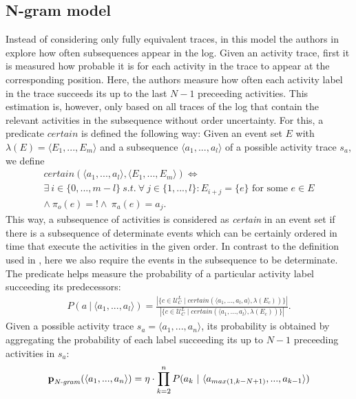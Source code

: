 \subsection{N-gram model}
Instead of considering only fully equivalent traces, in this model the authors in \cite{por} explore how often subsequences appear in the log.
Given an activity trace, first it is measured how probable it is for each activity in the trace to appear at the corresponding position.
Here, the authors measure how often each activity label in the trace succeeds its up to the last $N-1$ preceeding activities.
This estimation is, however, only based on all traces of the log that contain the relevant activities in the subsequence without order uncertainty.
For this, a predicate $certain$ is defined the following way: 
Given an event set $E$ with $\lambda(E)=\langle E_1,...,E_m\rangle$ and a subsequence $\langle a_1,...,a_l\rangle$ of a possible activity trace $s_a$, we define
\begin{align*}
certain(\langle a_1,...,a_l \rangle, \langle E_1,...,E_m \rangle) \Leftrightarrow \\
\exists ~ i \in \{0,...,m-l\} ~ s.t.~
\forall ~ j \in \{1,...,l\}: E_{i+j} = \{e\} \text{ for some } e \in E \\ \wedge ~ \pi_o(e)=! \wedge ~ \pi_a(e)= a_j.
\end{align*}
This way, a subsequence of activities is considered as \textit{certain} in an event set if there is a subsequence of determinate events which can be certainly ordered in time that execute the activities in the given order.
In contrast to the definition used in \cite{por}, here we also require the events in the subsequence to be determinate.
The predicate helps measure the probability of a particular activity label succeeding its predecessors:
\begin{align*}
P(a ~ | ~ \langle a_1,...,a_l \rangle) = \frac{|\{c \in \mathcal{U}_C^L \mid
certain(\langle a_1,...,a_l,a \rangle, \lambda(E_c)) \}|}
{|\{c \in \mathcal{U}_C^L \mid
certain(\langle a_1,...,a_l \rangle, \lambda(E_c)) \}|}.
\end{align*}
Given a possible activity trace $s_a=\langle a_1,...,a_n\rangle$, its probability is obtained by aggregating the probability of each label succeeding its up to $N-1$ preceeding activities in $s_a$:
\begin{align*}
\textbf{p}_{\text{\textit{N-gram}}}(\langle a_1,...,a_n \rangle) =  \eta \cdot
\prod_{k=2}^n P(a_k ~ | ~ \langle a_{max(1,k-N+1)},..., a_{k-1}\rangle)
\end{align*}
